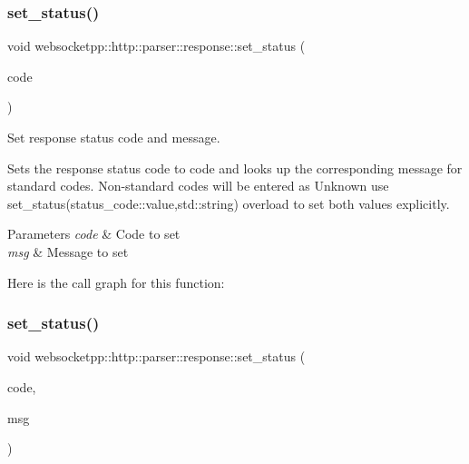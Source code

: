 \subsubsection{\texorpdfstring{set\+\_\+status()}{set\_status()}\hspace{0.1cm}{\footnotesize\ttfamily [1/2]}}
{\footnotesize\ttfamily void websocketpp\+::http\+::parser\+::response\+::set\+\_\+status (\begin{DoxyParamCaption}\item[{status\+\_\+code\+::value}]{code }\end{DoxyParamCaption})\hspace{0.3cm}{\ttfamily [inline]}}



Set response status code and message. 

Sets the response status code to {\ttfamily code} and looks up the corresponding message for standard codes. Non-\/standard codes will be entered as Unknown use set\+\_\+status(status\+\_\+code\+::value,std\+::string) overload to set both values explicitly.


\begin{DoxyParams}{Parameters}
{\em code} & Code to set \\
\hline
{\em msg} & Message to set \\
\hline
\end{DoxyParams}
Here is the call graph for this function\+:
\mbox{\label{classwebsocketpp_1_1http_1_1parser_1_1response_ab673f0371af7934e8abb6946a2952f57}} 
\subsubsection{\texorpdfstring{set\+\_\+status()}{set\_status()}\hspace{0.1cm}{\footnotesize\ttfamily [2/2]}}
{\footnotesize\ttfamily void websocketpp\+::http\+::parser\+::response\+::set\+\_\+status (\begin{DoxyParamCaption}\item[{status\+\_\+code\+::value}]{code,  }\item[{std\+::string const \&}]{msg }\end{DoxyParamCaption})\hspace{0.3cm}{\ttfamily [inline]}}



